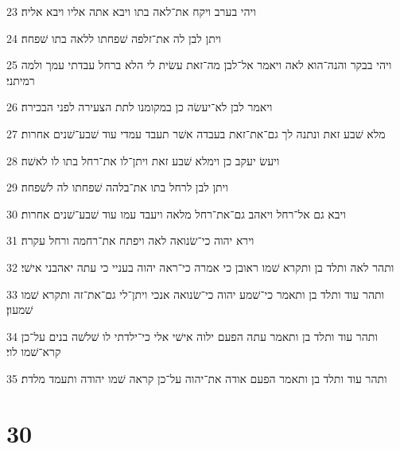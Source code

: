 \par 23 ויהי בערב ויקח את־לאה בתו ויבא אתה אליו ויבא אליה׃
\par 24 ויתן לבן לה את־זלפה שׁפחתו ללאה בתו שׁפחה׃
\par 25 ויהי בבקר והנה־הוא לאה ויאמר אל־לבן מה־זאת עשׂית לי הלא ברחל עבדתי עמך ולמה רמיתני׃
\par 26 ויאמר לבן לא־יעשׂה כן במקומנו לתת הצעירה לפני הבכירה׃
\par 27 מלא שׁבע זאת ונתנה לך גם־את־זאת בעבדה אשׁר תעבד עמדי עוד שׁבע־שׁנים אחרות׃
\par 28 ויעשׂ יעקב כן וימלא שׁבע זאת ויתן־לו את־רחל בתו לו לאשׁה׃
\par 29 ויתן לבן לרחל בתו את־בלהה שׁפחתו לה לשׁפחה׃
\par 30 ויבא גם אל־רחל ויאהב גם־את־רחל מלאה ויעבד עמו עוד שׁבע־שׁנים אחרות׃
\par 31 וירא יהוה כי־שׂנואה לאה ויפתח את־רחמה ורחל עקרה׃
\par 32 ותהר לאה ותלד בן ותקרא שׁמו ראובן כי אמרה כי־ראה יהוה בעניי כי עתה יאהבני אישׁי׃
\par 33 ותהר עוד ותלד בן ותאמר כי־שׁמע יהוה כי־שׂנואה אנכי ויתן־לי גם־את־זה ותקרא שׁמו שׁמעון׃
\par 34 ותהר עוד ותלד בן ותאמר עתה הפעם ילוה אישׁי אלי כי־ילדתי לו שׁלשׁה בנים על־כן קרא־שׁמו לוי׃
\par 35 ותהר עוד ותלד בן ותאמר הפעם אודה את־יהוה על־כן קראה שׁמו יהודה ותעמד מלדת׃

\chapter{30}

